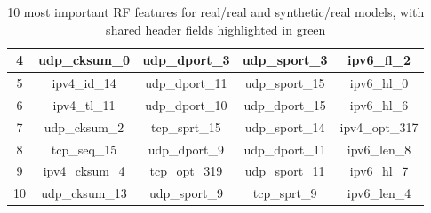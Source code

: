 \documentclass[sigconf, nonacm]{acmart}
\begin{document}
\begin{table}[h!]
\begin{tabular}{|c|c|c|c|c|}
4 & udp\_cksum\_0 & udp\_dport\_3 & udp\_sport\_3 & ipv6\_fl\_2 \\ \hline
5 & ipv4\_id\_14 & udp\_dport\_11 & udp\_sport\_15 & ipv6\_hl\_0 \\ \hline
6 & ipv4\_tl\_11 & udp\_dport\_10 & udp\_dport\_15 & ipv6\_hl\_6 \\ \hline
7 & udp\_cksum\_2 & tcp\_sprt\_15 & udp\_sport\_14 & ipv4\_opt\_317 \\ \hline
8 & tcp\_seq\_15 & udp\_dport\_9 & udp\_dport\_11 & ipv6\_len\_8 \\ \hline
9 & ipv4\_cksum\_4 & tcp\_opt\_319 & udp\_sport\_11 & ipv6\_hl\_7 \\ \hline
10 & udp\_cksum\_13 & udp\_sport\_9 & tcp\_sprt\_9 & ipv6\_len\_4 \\ \hline
\end{tabular}
\caption{10 most important RF features for real/real and synthetic/real models, with shared header fields highlighted in green}
\label{tab:recreated_table_part2}
\end{table}
\FloatBarrier




\end{document}
